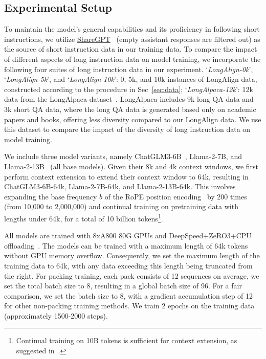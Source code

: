 \subsection{Experimental Setup}
To maintain the model's general capabilities and its proficiency in following short instructions, we utilize \href{https://huggingface.co/datasets/anon8231489123/ShareGPT_Vicuna_unfiltered/tree/main/HTML_cleaned_raw_dataset}{ShareGPT}~\cite{vicuna2023} (empty assistant responses are filtered out) as the source of short instruction data in our training data. 
To compare the impact of different aspects of long instruction data on model training, we incorporate the following four suites of long instruction data in our experiment.
`\emph{LongAlign-0k}', `\emph{LongAlign-5k}', and `\emph{LongAlign-10k}': 0, 5k, and 10k instances of LongAlign data, constructed according to the procedure in Sec~\ref{sec:data}; `\emph{LongAlpaca-12k}': 12k data from the LongAlpaca dataset~\cite{chen2023longlora}. LongAlpaca includes 9k long QA data and 3k short QA data, where the long QA data is generated based only on academic papers and books, offering less diversity compared to our LongAlign data. We use this dataset to compare the impact of the diversity of long instruction data on model training.

We include three model variants, namely ChatGLM3-6B~\cite{du2022glm,zeng2022glm}, Llama-2-7B, and Llama-2-13B~\cite{touvron2023llama} (all base models).
Given their 8k and 4k context windows, we first perform context extension to extend their context window to 64k, resulting in ChatGLM3-6B-64k, Llama-2-7B-64k, and Llama-2-13B-64k. This involves expanding the base frequency $b$ of the RoPE position encoding~\cite{su2024roformer} by 200 times (from 10,000 to 2,000,000) and continual training on pretraining data with lengths under 64k, for a total of 10 billion tokens\footnote{Continual training on 10B tokens is sufficient for context extension, as suggested in~\citet{fu2023longdata}.}.

All models are trained with 8xA800 80G GPUs and DeepSpeed+ZeRO3+CPU offloading~\cite{rasley2020deepspeed}.
The models can be trained with a maximum length of 64k tokens without GPU memory overflow. Consequently, we set the maximum length of the training data to 64k, with any data exceeding this length being truncated from the right.
For packing training, each pack consists of 12 sequences on average, we set the total batch size to 8, resulting in a global batch size of 96.
For a fair comparison, we set the batch size to 8, with a gradient accumulation step of 12 for other non-packing training methods.
We train 2 epochs on the training data (approximately 1500-2000 steps).

